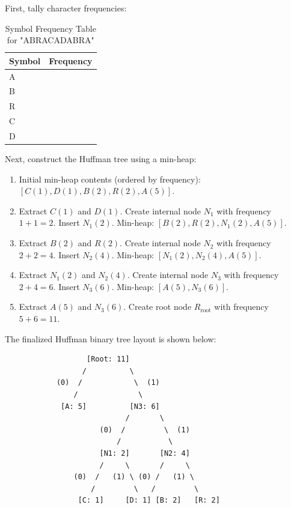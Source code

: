 \documentclass[12pt]{report}
\begin{document}
First, tally character frequencies:

\begin{table}[htbp]
\centering
\caption{Symbol Frequency Table for "ABRACADABRA"}
\begin{tabularx}{0.6\textwidth}{@{} >{\centering\arraybackslash}X >{\centering\arraybackslash}X @{}}
\toprule
\textbf{Symbol} & \textbf{Frequency} \\
\midrule
A & 5 \\
B & 2 \\
R & 2 \\
C & 1 \\
D & 1 \\
\bottomrule
\end{tabularx}
\end{table}

Next, construct the Huffman tree using a min-heap:
\begin{enumerate}
    \item Initial min-heap contents (ordered by frequency): $[C(1), D(1), B(2), R(2), A(5)]$.
    \item Extract $C(1)$ and $D(1)$. Create internal node $N_1$ with frequency $1 + 1 = 2$. Insert $N_1(2)$. Min-heap: $[B(2), R(2), N_1(2), A(5)]$.
    \item Extract $B(2)$ and $R(2)$. Create internal node $N_2$ with frequency $2 + 2 = 4$. Insert $N_2(4)$. Min-heap: $[N_1(2), N_2(4), A(5)]$.
    \item Extract $N_1(2)$ and $N_2(4)$. Create internal node $N_3$ with frequency $2 + 4 = 6$. Insert $N_3(6)$. Min-heap: $[A(5), N_3(6)]$.
    \item Extract $A(5)$ and $N_3(6)$. Create root node $R_{\text{root}}$ with frequency $5 + 6 = 11$.
\end{enumerate}

The finalized Huffman binary tree layout is shown below:

\begin{verbatim}
                   [Root: 11]
                  /          \
            (0)  /            \  (1)
                /              \
             [A: 5]          [N3: 6]
                            /       \
                      (0)  /         \  (1)
                          /           \
                      [N1: 2]       [N2: 4]
                      /     \       /     \
                (0)  /   (1) \ (0) /   (1) \
                    /         \   /         \
                 [C: 1]     [D: 1] [B: 2]   [R: 2]
\end{verbatim}
\end{document}
